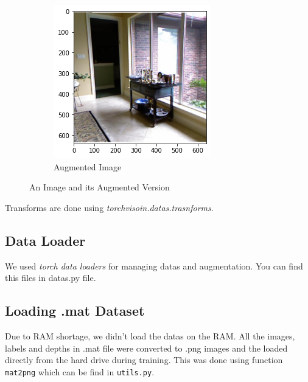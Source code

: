 \documentclass[a4paper, openany]{book}
\newcommand{\code}{\texttt}
\begin{document}
\begin{figure}[ht]
\begin{subfigure}[b]{0.3\linewidth}
    \includegraphics[width=\linewidth]{images/aug_image.png}
    \caption{Augmented Image}
  \end{subfigure}
  \caption{An Image and its Augmented Version}
  \label{fig:augment}
\end{figure}

Transforms are done using \textit{torchvisoin.datas.trasnforms}.
\subsection{Data Loader}
	\vspace{0.3cm}
We used \textit{torch data loaders} for managing datas and augmentation. You can find this files in datas.py file.

\subsection{Loading .mat Dataset}
	\vspace{0.3cm}

Due to RAM shortage, we didn't load the datas on the RAM. All the images, labels and depths in .mat file were converted to .png images and the loaded directly from the hard drive during training. This was done using function \code{mat2png} which can be find in \code{utils.py}.


\newpage
\end{document}
